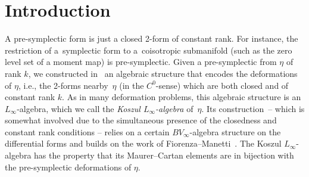 \documentclass[pdftex]{sigma}
\numberwithin{equation}{section}
\begin{document}
\allowdisplaybreaks

\newcommand{\arXivNumber}{1807.10148}

\renewcommand{\PaperNumber}{128}

\FirstPageHeading











\section{Introduction}

A pre-symplectic form is just a closed 2-form of constant rank. For instance, the restriction of a~symplectic form to a~coisotropic submanifold (such as the zero level set of a moment map) is pre-symplectic. Given a pre-symplectic from $\eta$ of rank $k$, we constructed in~\cite{SZPre} an algebraic structure that encodes the deformations of $\eta$, i.e., the 2-forms nearby~$\eta$ (in the $C^0$-sense) which are both closed and of constant rank $k$. As in many deformation problems, this algebraic structure is an $L_{\infty}$-algebra, which we call the \emph{Koszul $L_{\infty}$-algebra} of~$\eta$. Its construction~-- which is somewhat involved due to the simultaneous presence of the closedness and constant rank conditions -- relies on a certain $BV_{\infty}$-algebra structure on the differential forms and builds on the work of Fiorenza--Manetti~\cite{Fiorenza--Manetti}. The Koszul $L_{\infty}$-algebra has the property that its Maurer--Cartan elements are in bijection with the pre-symplectic deformations of $\eta$.
\end{document}
